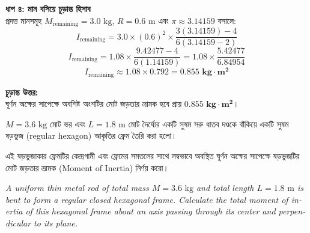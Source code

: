 \documentclass[12pt, a4paper]{article}
\begin{document}
\begin{tcolorbox}[solutionbox={সমাধান (Solution)}]
\vspace{0.5em}
\noindent
\textbf{ধাপ ৪: মান বসিয়ে চূড়ান্ত হিসাব} \\
প্রদত্ত মানসমূহ $M_{\text{remaining}} = 3.0\text{ kg}$, $R = 0.6\text{ m}$ এবং $\pi \approx 3.14159$ বসালে:
$$I_{\text{remaining}} = 3.0 \times (0.6)^2 \times \frac{3(3.14159) - 4}{6(3.14159 - 2)}$$
$$I_{\text{remaining}} = 1.08 \times \frac{9.42477 - 4}{6(1.14159)} = 1.08 \times \frac{5.42477}{6.84954}$$
$$I_{\text{remaining}} \approx 1.08 \times 0.792 = \mathbf{0.855\text{ kg}\cdot\text{m}^2}$$

\vspace{1em}
\begin{tcolorbox}[answerbox]
\textbf{চূড়ান্ত উত্তর:} \\
ঘূর্ণন অক্ষের সাপেক্ষে অবশিষ্ট অংশটির মোট জড়তার ভ্রামক হবে প্রায় $\mathbf{0.855\text{ kg}\cdot\text{m}^2}$।
\end{tcolorbox}
\end{tcolorbox}

\begin{tcolorbox}[questionbox={প্রশ্ন (Question)16}]
\noindent
$M = 3.6\text{ kg}$ মোট ভর এবং $L = 1.8\text{ m}$ মোট দৈর্ঘ্যের একটি সুষম সরু ধাতব দণ্ডকে বাঁকিয়ে একটি সুষম ষড়ভুজ (regular hexagon) আকৃতির ফ্রেম তৈরি করা হলো। 

\vspace{0.3em}
\noindent
এই ষড়ভুজাকার ফ্রেমটির কেন্দ্রগামী এবং ফ্রেমের সমতলের সাথে লম্বভাবে অবস্থিত ঘূর্ণন অক্ষের সাপেক্ষে ষড়ভুজটির মোট জড়তার ভ্রামক (Moment of Inertia) নির্ণয় করো।

\vspace{0.8em}
\begin{english}
\noindent\textit{\color{darkgray}
A uniform thin metal rod of total mass $M = 3.6\text{ kg}$ and total length $L = 1.8\text{ m}$ is bent to form a regular closed hexagonal frame. Calculate the total moment of inertia of this hexagonal frame about an axis passing through its center and perpendicular to its plane.
}
\end{english}
\end{tcolorbox}
\end{document}
